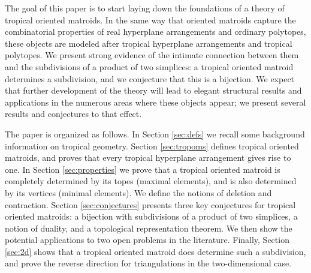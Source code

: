 \documentclass[11pt]{amsart}
\begin{document}
The goal of this paper is to start laying down the foundations of a theory of tropical oriented matroids. In the same way that oriented matroids capture the combinatorial properties of real hyperplane arrangements and ordinary polytopes, these objects are modeled after tropical hyperplane arrangements and tropical polytopes. 
We present strong evidence of the intimate connection between them and the subdivisions of a product of two simplices: a tropical oriented matroid determines a subdivision, and we conjecture that this is a bijection. 
We expect that further development of the theory will lead to elegant structural results and 
applications in the numerous areas where these objects appear; we present several results and conjectures to that effect.



\medskip

The paper is organized as follows. In Section \ref{sec:defs} we recall some background information on tropical geometry. Section \ref{sec:tropoms} defines tropical oriented matroids, and proves that every tropical hyperplane arrangement gives rise to one. In Section \ref{sec:properties} we prove that a tropical oriented matroid is completely determined by its topes (maximal elements), and is also determined by its vertices (minimal elements). We define the notions of deletion and contraction. Section \ref{sec:conjectures} presents three key conjectures for tropical oriented matroids: a bijection with subdivisions of a product of two simplices, a notion of duality,
and a topological representation theorem. We then show the potential applications to two open problems in the literature. Finally, Section \ref{sec:2d} shows that a tropical oriented matroid does determine such a subdivision, and prove the reverse direction for triangulations in the two-dimensional case.





\end{document}
